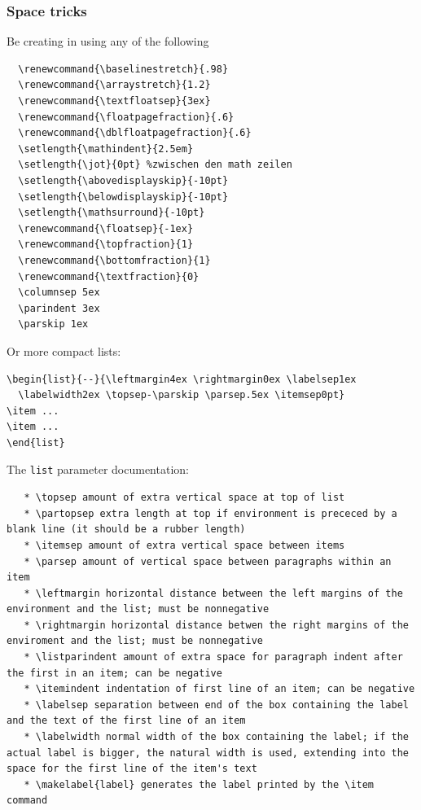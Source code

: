 \subsubsection{Space tricks}

Be creating in using any of the following\\
\begin{code}
\begin{verbatim}
  \renewcommand{\baselinestretch}{.98}
  \renewcommand{\arraystretch}{1.2}
  \renewcommand{\textfloatsep}{3ex}
  \renewcommand{\floatpagefraction}{.6}
  \renewcommand{\dblfloatpagefraction}{.6}
  \setlength{\mathindent}{2.5em}
  \setlength{\jot}{0pt} %zwischen den math zeilen
  \setlength{\abovedisplayskip}{-10pt}
  \setlength{\belowdisplayskip}{-10pt}
  \setlength{\mathsurround}{-10pt}
  \renewcommand{\floatsep}{-1ex}
  \renewcommand{\topfraction}{1}
  \renewcommand{\bottomfraction}{1}
  \renewcommand{\textfraction}{0}
  \columnsep 5ex
  \parindent 3ex
  \parskip 1ex
\end{verbatim}
\end{code}

Or more compact lists:\\
\begin{code}
\begin{verbatim}
\begin{list}{--}{\leftmargin4ex \rightmargin0ex \labelsep1ex
  \labelwidth2ex \topsep-\parskip \parsep.5ex \itemsep0pt}
\item ...
\item ...
\end{list}
\end{verbatim}
\end{code}

The \verb+list+ parameter documentation:\\
\begin{code}
\begin{verbatim}
   * \topsep amount of extra vertical space at top of list
   * \partopsep extra length at top if environment is prececed by a blank line (it should be a rubber length)
   * \itemsep amount of extra vertical space between items
   * \parsep amount of vertical space between paragraphs within an item
   * \leftmargin horizontal distance between the left margins of the environment and the list; must be nonnegative
   * \rightmargin horizontal distance betwen the right margins of the enviroment and the list; must be nonnegative
   * \listparindent amount of extra space for paragraph indent after the first in an item; can be negative
   * \itemindent indentation of first line of an item; can be negative
   * \labelsep separation between end of the box containing the label and the text of the first line of an item
   * \labelwidth normal width of the box containing the label; if the actual label is bigger, the natural width is used, extending into the space for the first line of the item's text
   * \makelabel{label} generates the label printed by the \item command
\end{verbatim}
\end{code}

